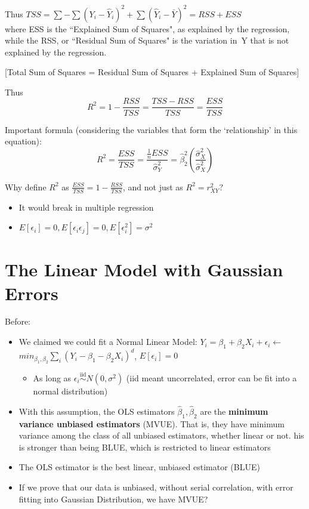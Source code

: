 \documentclass[10pt, oneside]{article}
\begin{document}
Thus $TSS = \sum - \sum(Y_i -\hat Y_i)^2 + \sum(\hat Y_i -\bar Y)^2 = RSS+ESS$\\
where ESS is the ``Explained Sum of Squares", as explained by the regression, while the RSS, or ``Residual Sum of Squares" is the variation in Y that is not explained by the regression. 

[Total Sum of Squares = Residual Sum of Squares + Explained Sum of Squares]

Thus
$$R^2 = 1 -\frac{RSS}{TSS} = \frac{TSS-RSS}{TSS}=\frac{ESS}{TSS}$$

Important formula (considering the variables that form the `relationship' in this equation):
$$R^2 = \frac{ESS}{TSS}=\frac{\frac{1}{n} ESS}{\hat \sigma^2 _Y} =\hat \beta_2 ^2 (\frac{\hat \sigma^2 _X}{\hat \sigma ^2 _X})$$

Why define $R^2$ as $\frac{ESS}{TSS}=1-\frac{RSS}{TSS}$, and not just as $R^2 = r^2_{XY}?$
\begin{itemize}
    \item It would break in multiple regression
\end{itemize}

\begin{itemize}
    \item $E[\epsilon_i] = 0, E[\epsilon_i \epsilon_j ] = 0, E[\epsilon_i ^2 ] = \sigma^2$
\end{itemize}

\section{The Linear Model with Gaussian Errors}
Before:
\begin{itemize}
    \item We claimed we could fit a Normal Linear Model: $Y_i = \beta_1 + \beta_2 X_i +\epsilon_i \leftarrow$ $min_{\beta_1,\beta_2} \sum_i (Y_i -\beta_1 -\beta_2 X_i)^d$, $E[\epsilon_i] = 0$
    \begin{itemize}
        \item As long as $\epsilon_i \overset{\text{iid}}{\sim} N(0,\sigma^2)$ (iid meant uncorrelated, error can be fit into a normal distribution)
    \end{itemize}
    \item With this assumption, the OLS estimators $\hat \beta_1,\hat \beta_2$ are the \textbf{minimum variance unbiased estimators} (MVUE). That is, they have minimum variance among the class of all unbiased estimators, whether linear or not. his is stronger than being BLUE, which is restricted to linear estimators
    \item The OLS estimator is the best linear, unbiased estimator (BLUE)
    \item If we prove that our data is unbiased, without serial correlation, with error fitting into Gaussian Distribution, we have MVUE?

\end{itemize}
\end{document}
